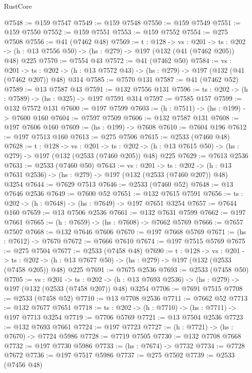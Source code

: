 \begin{lexlean}{RustCore}
\begin{coremodule}
@7548 := @159 @7547
@7549 := @159 @7548
@7550 := @159 @7549
@7551 := @159 @7550
@7552 := @159 @7551
@7553 := @159 @7552
@7554 := @275 @7508
@7556 := @41 (@7462 @48)
@7569 := {t : @128} ->
  {vs : @201} ->
  {ts : @202} -> (h : @13 @7556 @50) -> (hs : @279) -> @197 (@132 (@41 (@7462 @205)) @48) @225
@7570 := @7554 @43
@7572 := @41 (@7462 @50)
@7584 := {vs : @201} ->
  {ts : @202} -> (h : @13 @7572 @43) -> (hs : @279) -> @197 (@132 (@41 (@7462 @207)) @48) @314
@7585 := @7570 @131
@7587 := @41 (@7462 @52)
@7589 := @13 @7587 @43
@7591 := @132 @7556 @131
@7596 := {ts : @202} -> (h : @7589) -> (hs : @325) -> @197 @7591 @314
@7597 := @7585 @157
@7599 := @132 @7572 @131
@7600 := @197 @7599
@7603 := (h : @7511) -> (hs : @199) -> @7600 @160
@7604 := @7597 @7509
@7606 := @132 @7587 @131
@7608 := @197 @7606 @160
@7609 := (hs : @199) -> @7608
@7610 := @7604 @196
@7612 := @197 @7513 @160
@7613 := @275 @7506
@7615 := @2533 (@7460 @48)
@7628 := {t : @128} ->
  {vs : @201} ->
  {ts : @202} -> (h : @13 @7615 @50) -> (hs : @279) -> @197 (@132 (@2533 (@7460 @205)) @48) @225
@7629 := @7613 @2536
@7631 := @2533 (@7460 @50)
@7643 := {vs : @201} ->
  {ts : @202} -> (h : @13 @7631 @2536) -> (hs : @279) -> @197 (@132 (@2533 (@7460 @207)) @48) @3254
@7644 := @7629 @7513
@7646 := @2533 (@7460 @52)
@7648 := @13 @7646 @2536
@7649 := @7600 @52
@7651 := @132 @7615 @7591
@7656 := {ts : @202} -> (h : @7648) -> (hs : @7649) -> @197 @7651 @3254
@7657 := @7644 @160
@7659 := @13 @7506 @2536
@7661 := @132 @7631 @7599
@7662 := @197 @7661
@7665 := (h : @7659) -> (hs : @7608) -> @7662 @5769
@7666 := @7657 @7507
@7668 := @132 @7646 @7606
@7670 := @197 @7668 @5769
@7671 := (hs : @7612) -> @7670
@7672 := @7666 @7610
@7674 := @197 @7515 @5769
@7675 := @275 @7504
@7677 := @2533 (@7458 @48)
@7690 := {t : @128} ->
  {vs : @201} ->
  {ts : @202} -> (h : @13 @7677 @50) -> (hs : @279) -> @197 (@132 (@2533 (@7458 @205)) @48) @225
@7691 := @7675 @2536
@7693 := @2533 (@7458 @50)
@7705 := {vs : @201} ->
  {ts : @202} -> (h : @13 @7693 @2536) -> (hs : @279) -> @197 (@132 (@2533 (@7458 @207)) @48) @3254
@7706 := @7691 @7515
@7708 := @2533 (@7458 @52)
@7710 := @13 @7708 @2536
@7711 := @7662 @52
@7713 := @132 @7677 @7651
@7718 := {ts : @202} -> (h : @7710) -> (hs : @7711) -> @197 @7713 @3254
@7719 := @7706 @5769
@7721 := @13 @7504 @2536
@7723 := @132 @7693 @7661
@7724 := @197 @7723
@7727 := (h : @7721) -> (hs : @7670) -> @7724 @5986
@7728 := @7719 @7505
@7730 := @132 @7708 @7668
@7732 := @197 @7730 @5986
@7733 := (hs : @7674) -> @7732
@7734 := @7728 @7672
@7736 := @197 @7517 @5986
@7737 := @275 @7502
@7739 := @2533 (@7456 @48)

\end{coremodule}
\end{lexlean}

